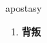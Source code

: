 
\begin{frame}
{\huge apostasy}
\begin{center}
\begin{enumerate}\Large
  \item \textbf{背叛}
\end{enumerate}
\end{center}
\end{frame}
